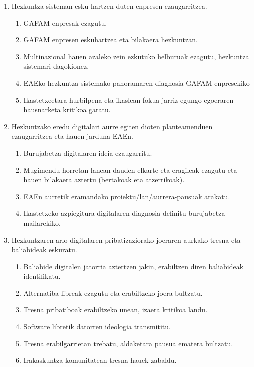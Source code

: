 \begin{enumerate}
    \item Hezkuntza sisteman esku hartzen duten enpresen ezaugarritzea.
    \begin{enumerate}
        \item GAFAM enpresak ezagutu.
        \item GAFAM enpresen eskuhartzea eta bilakaera hezkuntzan.
        \item Multinazional hauen azaleko zein ezkutuko helburuak ezagutu, hezkuntza sistemari dagokionez.
        \item EAEko hezkuntza sistemako panoramaren diagnosia GAFAM enpresekiko
        \item Ikastetxeetara hurbilpena eta ikaslean fokua jarriz egungo egoeraren hausnarketa kritikoa garatu.
\end{enumerate}
    \item Hezkuntzako eredu digitalari aurre egiten dioten planteamenduen ezaugarritzea eta hauen jarduna EAEn.
    \begin{enumerate}
        \item Burujabetza digitalaren ideia ezaugarritu.
        \item Mugimendu horretan lanean dauden elkarte eta eragileak ezagutu eta hauen bilakaera aztertu (bertakoak eta atzerrikoak).
        \item EAEn aurretik eramandako proiektu/lan/aurrera-pausuak arakatu.
        \item Ikastetxeko azpiegitura digitalaren diagnosia definitu burujabetza mailarekiko.
\end{enumerate}
    \item Hezkuntzaren arlo digitalaren pribatizaziorako joeraren aurkako tresna eta baliabideak eskuratu.
    \begin{enumerate}
        \item Baliabide digitalen jatorria aztertzen jakin, erabiltzen diren baliabideak identifikatu.
        \item Alternatiba libreak ezagutu eta erabiltzeko joera bultzatu.
        \item Tresna pribatiboak erabiltzeko unean, izaera kritikoa landu.
        \item Software libretik datorren ideologia transmititu.
        \item Tresna erabilgarrietan trebatu, aldaketara pausua ematera bultzatu. 
        \item Irakaskuntza komunitatean tresna hauek zabaldu.
\end{enumerate}
\end{enumerate}


